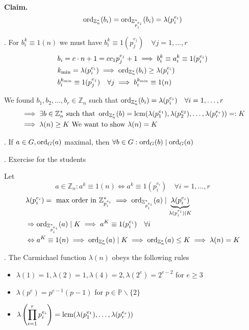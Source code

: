 \textbf{Claim.}
\[
  \operatorname{ord}_{\mathbb{Z}_n^{*}}(b_i) = \operatorname{ord}_{\mathbb{Z}_{p_i^{e_i}}^{*}} (b_i) = \lambda(p_i^{e_i})
\]

\Proof.
For $b_i^k \equiv 1 (n)$ we must have $b_i^k \equiv 1 (p_j^{e_j}) \quad \forall j = 1, \ldots, r$
\begin{align*}
  &b_i = c\cdot n+1 = c c_1 p_j^{e_j} +1 \implies b_i^k \equiv a_i^k \equiv 1 (p_i ^{e_i}) \\
  &k_{\min} = \lambda(p_i^{e_i}) \implies \operatorname{ord}_{\mathbb{Z}_n^{*}}(b_i) \geq \lambda(p_i^{e_i}) \\
  &b_i^{k_{\min}} \equiv 1 (p_j^{e_j}) \quad \forall j \implies b_i^{k_{\min}} \equiv 1 (n)
\end{align*}

We found $b_1, b_2, \ldots, b_r \in \mathbb{Z}_n$ such that $\operatorname{ord}_{\mathbb{Z}_n^{*}}(b_i) = \lambda(p_i^{e_i}) \quad \forall i = 1, \ldots, r$
\begin{align*}
  &\implies \exists b \in \mathbb{Z}_n^{*} \text{ such that } \operatorname{ord}_{\mathbb{Z}_n^{*}}(b) = \operatorname{lcm}(\lambda(p_1^{e_1}), \lambda(p_2^{e_2}), \ldots, \lambda(p_r^{e_r})) =: K \\
  &\implies \lambda(n) \geq K \text{ We want to show $\lambda(n) = K$}
\end{align*}

\Theorem.
If $ a\in G, \operatorname{ord}_G(a)$ maximal, then $\forall b \in G: \operatorname{ord}_G(b) \mid \operatorname{ord}_G(a)$

\Proof.
Exercise for the students

Let
\[
  a\in \mathbb{Z}_n: a^k \equiv 1 (n) \Leftrightarrow a^k \equiv 1 (p_i^{e_i}) \quad \forall i = 1,\ldots, r
\]
\begin{align*}
  &\lambda(p_i^{e_i}) = \text{ max order in } \mathbb{Z}_{p_i^{e_i}}^{*} \implies \operatorname{ord}_{\mathbb{Z}_{p_i^{e_i}}^{*}}(a) \mid \underbrace{\lambda(p_i^{e_i})}_{\lambda(p_i^{e_i}) \mid K}\\
  &\Rightarrow \operatorname{ord}_{\mathbb{Z}_{p_i^{e_i}}^{*}}(a) \mid K \implies a^K \equiv 1 (p_i^{e_i}) \quad \forall i \\
  &\Leftrightarrow a^K \equiv 1 (n) \implies \operatorname{ord}_{\mathbb{Z}_{n}^{*}}(a) \mid K \implies  \operatorname{ord}_{\mathbb{Z}_n^{*}}(a) \leq K \implies \lambda(n) = K
\end{align*}

\Theorem.
The Carmichael function $\lambda(n)$ obeys the following rules

\begin{itemize}
  \item $\lambda(1) = 1, \lambda(2) = 1, \lambda(4) = 2, \lambda(2^e) = 2^{e-2} $ for $e \geq 3$
  \item $\lambda(p^e) = p^{e-1}(p-1)$ for $p\in \mathbb{P} \backslash\{2\}$
  \item $\displaystyle{\lambda\left(\prod_{i=1}^{r} p_i^{e_i}\right) = \operatorname{lcm}(\lambda(p_1^{e_1}), \ldots, \lambda(p_r^{e_r}))}$
\end{itemize}

